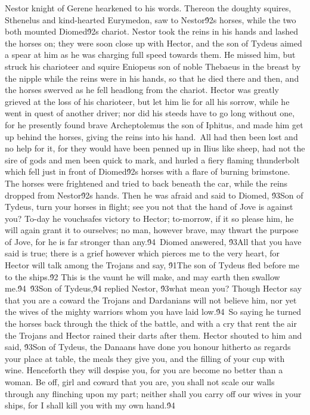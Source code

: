 {Nestor knight of Gerene hearkened to his words. Thereon the doughty squires, Sthenelus and kind-hearted Eurymedon, saw to Nestor\'92s horses, while the two both mounted Diomed\'92s chariot. Nestor took the reins in his hands and lashed the horses on; they were soon close up with Hector, and the son of Tydeus aimed a spear at him as he was charging full speed towards them. He missed him, but struck his charioteer and squire Eniopeus son of noble Thebaeus in the breast by the nipple while the reins were in his hands, so that he died there and then, and the horses swerved as he fell headlong from the chariot. Hector was greatly grieved at the loss of his charioteer, but let him lie for all his sorrow, while he went in quest of another driver; nor did his steeds have to go long without one, for he presently found brave Archeptolemus the son of Iphitus, and made him get up behind the horses, giving the reins into his hand.\
All had then been lost and no help for it, for they would have been penned up in Ilius like sheep, had not the sire of gods and men been quick to mark, and hurled a fiery flaming thunderbolt which fell just in front of Diomed\'92s horses with a flare of burning brimstone. The horses were frightened and tried to back beneath the car, while the reins dropped from Nestor\'92s hands. Then he was afraid and said to Diomed, \'93Son of Tydeus, turn your horses in flight; see you not that the hand of Jove is against you? To-day he vouchsafes victory to Hector; to-morrow, if it so please him, he will again grant it to ourselves; no man, however brave, may thwart the purpose of Jove, for he is far stronger than any.\'94\
Diomed answered, \'93All that you have said is true; there is a grief however which pierces me to the very heart, for Hector will talk among the Trojans and say, \'91The son of Tydeus fled before me to the ships.\'92 This is the vaunt he will make, and may earth then swallow me.\'94\
\'93Son of Tydeus,\'94 replied Nestor, \'93what mean you? Though Hector say that you are a coward the Trojans and Dardanians will not believe him, nor yet the wives of the mighty warriors whom you have laid low.\'94\
So saying he turned the horses back through the thick of the battle, and with a cry that rent the air the Trojans and Hector rained their darts after them. Hector shouted to him and said, \'93Son of Tydeus, the Danaans have done you honour hitherto as regards your place at table, the meals they give you, and the filling of your cup with wine. Henceforth they will despise you, for you are become no better than a woman. Be off, girl and coward that you are, you shall not scale our walls through any flinching upon my part; neither shall you carry off our wives in your ships, for I shall kill you with my own hand.\'94\
}
